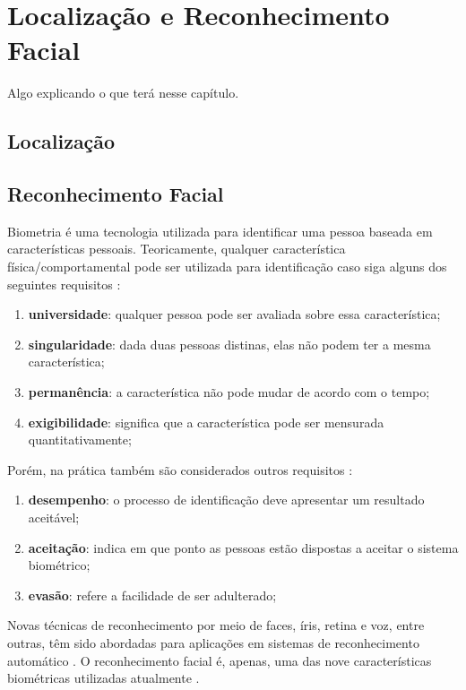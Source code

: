 
\chapter{Localização e Reconhecimento Facial}

	Algo explicando o que terá nesse capítulo.


\section{Localização}

\section{Reconhecimento Facial}

Biometria é uma tecnologia utilizada para identificar uma pessoa baseada em características pessoais. Teoricamente, qualquer característica física/comportamental pode ser utilizada para identificação caso siga alguns dos seguintes requisitos \cite{milene}: 

	\begin{enumerate}
		\item \textbf{universidade}: qualquer pessoa pode ser avaliada sobre essa característica;
		\item \textbf{singularidade}: dada duas pessoas distinas, elas não podem ter a mesma característica;
		\item \textbf{permanência}: a característica não pode mudar de acordo com o tempo;
		\item \textbf{exigibilidade}: significa que a característica pode ser mensurada quantitativamente;
	\end{enumerate}

Porém, na prática também são considerados outros requisitos \cite{milene}:

	\begin{enumerate}
		\item \textbf{desempenho}: o processo de identificação deve apresentar um resultado aceitável;
		\item \textbf{aceitação}: indica em que ponto as pessoas estão dispostas a aceitar o sistema biométrico;
		\item \textbf{evasão}: refere a facilidade de ser adulterado;
	\end{enumerate}

Novas técnicas de reconhecimento por meio de faces, íris, retina e voz, entre outras, têm sido abordadas para aplicações em sistemas de reconhecimento automático \cite{bolle} \cite{saocarlos}. O reconhecimento facial é, apenas, uma das nove características biométricas utilizadas atualmente \cite{milene}.
	
